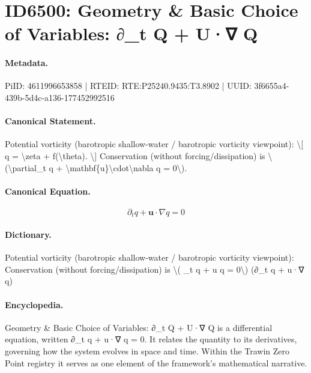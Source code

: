 \section*{ID6500: Geometry \& Basic Choice of Variables: ∂\_t Q + U·∇ Q}
\paragraph{Metadata.}
PiID: 4611996653858 | RTEID: RTE:P25240.9435:T3.8902 | UUID: 3f6655a4-439b-5d4c-a136-177452992516

\paragraph{Canonical Statement.}
Potential vorticity (barotropic shallow-water / barotropic vorticity viewpoint): \textbackslash{}[ q = \textbackslash{}zeta + f(\textbackslash{}theta). \textbackslash{}] Conservation (without forcing/dissipation) is \textbackslash{}(\textbackslash{}partial\_t q + \textbackslash{}mathbf\{u\}\textbackslash{}cdot\textbackslash{}nabla q = 0\textbackslash{}).

\paragraph{Canonical Equation.}
\[
\partial_t q + \mathbf{u}\cdot\nabla q = 0
\]

\paragraph{Dictionary.}
Potential vorticity (barotropic shallow-water / barotropic vorticity viewpoint): Conservation (without forcing/dissipation) is \textbackslash{}( \_t q + u q = 0\textbackslash{}) (∂\_t q + u·∇ q)

\paragraph{Encyclopedia.}
Geometry \& Basic Choice of Variables: ∂\_t Q + U·∇ Q is a differential equation, written ∂\_t q + u·∇ q = 0. It relates the quantity to its derivatives, governing how the system evolves in space and time. Within the Trawin Zero Point registry it serves as one element of the framework's mathematical narrative.
